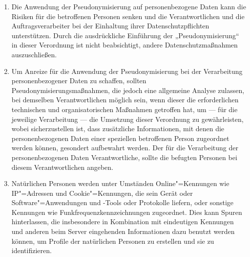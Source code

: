\begin{enumerate}

   \item Die Anwendung der Pseudonymisierung auf personenbezogene Daten kann die Risiken für die betroffenen Personen
    senken und die Verantwortlichen und die Auftragsverarbeiter bei der Einhaltung ihrer Datenschutzpflichten
    unterstützen. Durch die ausdrückliche Einführung der „Pseudonymisierung“ in dieser Verordnung ist nicht
    beabsichtigt, andere Datenschutzmaßnahmen auszuschließen.%
   \label{itm:eg-28}
   

   \item Um Anreize für die Anwendung der Pseudonymisierung bei der Verarbeitung personenbezogener Daten zu schaffen,
    sollten Pseudonymisierungsmaßnahmen, die jedoch eine allgemeine Analyse zulassen, bei demselben Verantwortlichen
    möglich sein, wenn dieser die erforderlichen technischen und organisatorischen Maßnahmen getroffen hat, um — für
    die jeweilige Verarbeitung — die Umsetzung dieser Verordnung zu gewährleisten, wobei sicherzustellen ist, dass
    zusätzliche Informationen, mit denen die personenbezogenen Daten einer speziellen betroffenen Person zugeordnet
    werden können, gesondert aufbewahrt werden. Der für die Verarbeitung der personenbezogenen Daten Verantwortliche,
    sollte die befugten Personen bei diesem Verantwortlichen angeben.%
   \label{itm:eg-29}
   

   \item Natürlichen Personen werden unter Umständen Online"=Kennungen wie IP"=Adressen und Cookie"=Kennungen, die sein
    Gerät oder Software"=Anwendungen und -Tools oder Protokolle liefern, oder sonstige Kennungen wie
    Funkfrequenzkennzeichnungen zugeordnet. Dies kann Spuren hinterlassen, die insbesondere in Kombination mit
    eindeutigen Kennungen und anderen beim Server eingehenden Informationen dazu benutzt werden können, um Profile der
    natürlichen Personen zu erstellen und sie zu identifizieren.%
   \label{itm:eg-30}
   


\end{enumerate}
